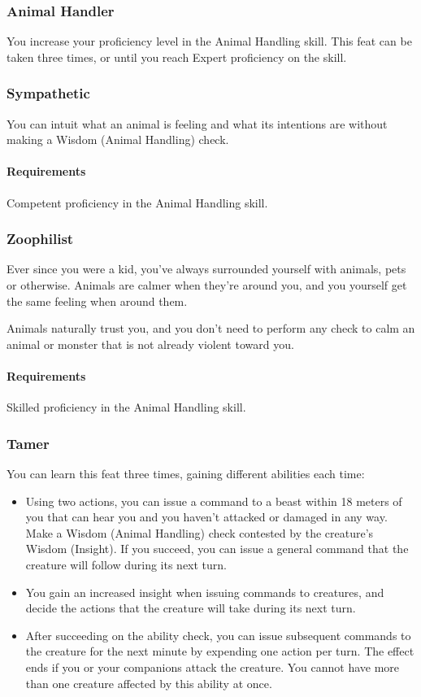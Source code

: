 \subsubsection{Animal Handler} \label{feat::animalhandler}
    You increase your proficiency level in the Animal Handling skill.
    This feat can be taken three times, or until you reach Expert proficiency on the skill.
\subsubsection{Sympathetic} \label{feat::sympathetic}
    You can intuit what an animal is feeling and what its intentions are without making a Wisdom (Animal Handling) check.
    \paragraph{Requirements} Competent proficiency in the Animal Handling skill.
\subsubsection{Zoophilist} \label{feat::zoophilist}
    Ever since you were a kid, you've always surrounded yourself with animals, pets or otherwise.
    Animals are calmer when they're around you, and you yourself get the same feeling when around them.

    Animals naturally trust you, and you don't need to perform any check to calm an animal or monster that is not already violent toward you.
    \paragraph{Requirements} Skilled proficiency in the Animal Handling skill.
\subsubsection{Tamer} \label{feat::tamer}
    You can learn this feat three times, gaining different abilities each time:
    \begin{itemize}
        \item Using two actions, you can issue a command to a beast within 18 meters of you that can hear you and you haven't attacked or damaged in any way.
        Make a Wisdom (Animal Handling) check contested by the creature's Wisdom (Insight).
        If you succeed, you can issue a general command that the creature will follow during its next turn.
        \item You gain an increased insight when issuing commands to creatures, and decide the actions that the creature will take during its next turn.
        \item After succeeding on the ability check, you can issue subsequent commands to the creature for the next minute by expending one action per turn.
        The effect ends if you or your companions attack the creature.
        You cannot have more than one creature affected by this ability at once.
    \end{itemize}
